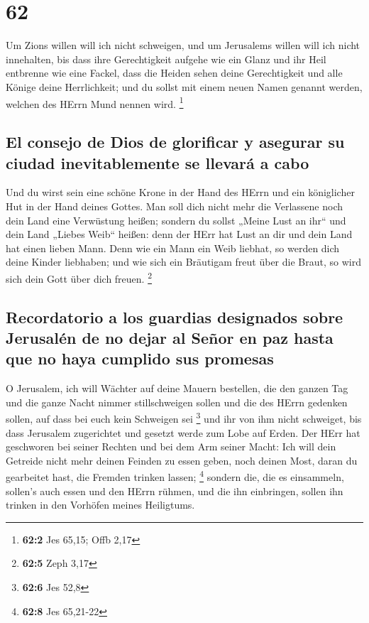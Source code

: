 \hypertarget{section-61}{%
\section{62}\label{section-61}}

 Um Zions willen will ich nicht schweigen, und um
Jerusalems willen will ich nicht innehalten, bis dass ihre Gerechtigkeit
aufgehe wie ein Glanz und ihr Heil entbrenne wie eine Fackel,
 dass die Heiden sehen deine Gerechtigkeit und alle Könige
deine Herrlichkeit; und du sollst mit einem neuen Namen genannt werden,
welchen des HErrn Mund nennen wird. \footnote{\textbf{62:2} Jes 65,15;
  Offb 2,17}

\hypertarget{el-consejo-de-dios-de-glorificar-y-asegurar-su-ciudad-inevitablemente-se-llevaruxe1-a-cabo}{%
\subsection{El consejo de Dios de glorificar y asegurar su ciudad
inevitablemente se llevará a
cabo}\label{el-consejo-de-dios-de-glorificar-y-asegurar-su-ciudad-inevitablemente-se-llevaruxe1-a-cabo}}

 Und du wirst sein eine schöne Krone in der Hand des HErrn
und ein königlicher Hut in der Hand deines Gottes.  Man
soll dich nicht mehr die Verlassene noch dein Land eine Verwüstung
heißen; sondern du sollst „Meine Lust an ihr`` und dein Land „Liebes
Weib`` heißen: denn der HErr hat Lust an dir und dein Land hat einen
lieben Mann.  Denn wie ein Mann ein Weib liebhat, so
werden dich deine Kinder liebhaben; und wie sich ein Bräutigam freut
über die Braut, so wird sich dein Gott über dich freuen. \footnote{\textbf{62:5}
  Zeph 3,17}

\hypertarget{recordatorio-a-los-guardias-designados-sobre-jerusaluxe9n-de-no-dejar-al-seuxf1or-en-paz-hasta-que-no-haya-cumplido-sus-promesas}{%
\subsection{Recordatorio a los guardias designados sobre Jerusalén de no
dejar al Señor en paz hasta que no haya cumplido sus
promesas}\label{recordatorio-a-los-guardias-designados-sobre-jerusaluxe9n-de-no-dejar-al-seuxf1or-en-paz-hasta-que-no-haya-cumplido-sus-promesas}}

 O Jerusalem, ich will Wächter auf deine Mauern bestellen,
die den ganzen Tag und die ganze Nacht nimmer stillschweigen sollen und
die des HErrn gedenken sollen, auf dass bei euch kein Schweigen sei
\footnote{\textbf{62:6} Jes 52,8}  und ihr von ihm nicht
schweiget, bis dass Jerusalem zugerichtet und gesetzt werde zum Lobe auf
Erden.  Der HErr hat geschworen bei seiner Rechten und bei
dem Arm seiner Macht: Ich will dein Getreide nicht mehr deinen Feinden
zu essen geben, noch deinen Most, daran du gearbeitet hast, die Fremden
trinken lassen; \footnote{\textbf{62:8} Jes 65,21-22} 
sondern die, die es einsammeln, sollen's auch essen und den HErrn
rühmen, und die ihn einbringen, sollen ihn trinken in den Vorhöfen
meines Heiligtums.

